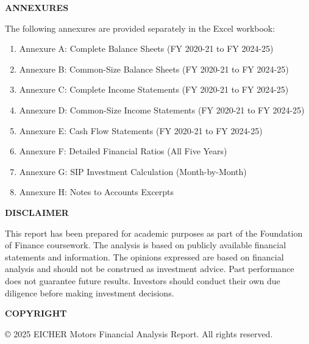 \documentclass[8pt,a4paper]{article}
\begin{document}
\vspace{2cm}

\begin{center}
\textbf{ANNEXURES}
\end{center}

The following annexures are provided separately in the Excel workbook:
\begin{enumerate}
    \item Annexure A: Complete Balance Sheets (FY 2020-21 to FY 2024-25)
    \item Annexure B: Common-Size Balance Sheets (FY 2020-21 to FY 2024-25)
    \item Annexure C: Complete Income Statements (FY 2020-21 to FY 2024-25)
    \item Annexure D: Common-Size Income Statements (FY 2020-21 to FY 2024-25)
    \item Annexure E: Cash Flow Statements (FY 2020-21 to FY 2024-25)
    \item Annexure F: Detailed Financial Ratios (All Five Years)
    \item Annexure G: SIP Investment Calculation (Month-by-Month)
    \item Annexure H: Notes to Accounts Excerpts
\end{enumerate}

\vspace{2cm}

\begin{center}
\textbf{DISCLAIMER}
\end{center}

This report has been prepared for academic purposes as part of the Foundation of Finance coursework. The analysis is based on publicly available financial statements and information. The opinions expressed are based on financial analysis and should not be construed as investment advice. Past performance does not guarantee future results. Investors should conduct their own due diligence before making investment decisions.

\vspace{1cm}

\begin{center}
\textbf{COPYRIGHT}
\end{center}

© 2025 EICHER Motors Financial Analysis Report. All rights reserved.
\end{document}
